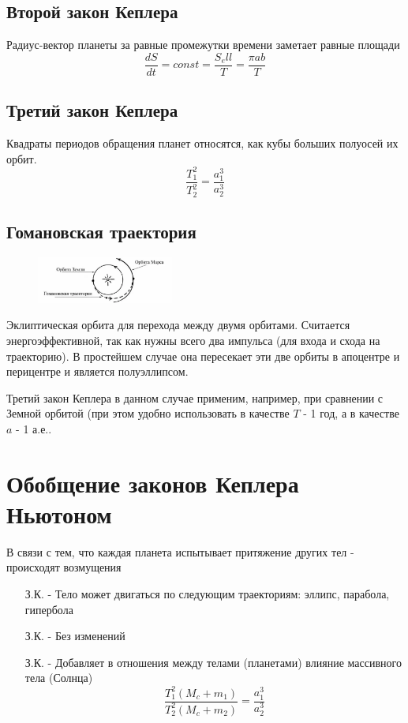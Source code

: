 \documentclass[16pt,a4paper]{report}
\begin{document}
\subsection{Второй закон Кеплера}
Радиус-вектор планеты за равные промежутки времени заметает равные площади
$$\frac{dS}{dt} = const = \frac{S_ell}{T} = \frac{\pi ab}{T}$$
\subsection{Третий закон Кеплера}
Квадраты периодов обращения планет относятся, как кубы больших полуосей их орбит.
$$\frac{T_1^2}{T_2^2} = \frac{a_1^3}{a_2^3}$$
\subsection{Гомановская траектория}
\begin{figure} %
    \centering
    \includegraphics[width=0.4\textwidth]{goman.png}
\end{figure}
Эклиптическая орбита для перехода между двумя орбитами. Считается энергоэффективной, так как нужны всего два импульса (для входа и схода на траекторию). В простейшем случае она пересекает эти две орбиты в апоцентре и перицентре и является полуэллипсом.

Третий закон Кеплера в данном случае применим, например, при сравнении с Земной орбитой (при этом удобно использовать в качестве $T$ - 1 год, а в качестве $a$ - 1 а.е..
\section{Обобщение законов Кеплера Ньютоном}
В связи с тем, что каждая планета испытывает притяжение других тел - происходят возмущения
\setcounter{foo}{1} 
\begin{enumerate}
    \item [\Roman{foo} З.К.] - Тело может двигаться по следующим траекториям: эллипс, парабола, гипербола \setcounter{foo}{2}
    \item [\Roman{foo} З.К.] - Без изменений \setcounter{foo}{3}
    \item [\Roman{foo} З.К.] - Добавляет в отношения между телами (планетами) влияние массивного тела (Солнца) $$\frac{T_1^2(M_c + m_1)}{T_2^2(M_c + m_2)}=\frac{a_1^3}{a_2^3}$$
\end{enumerate}
\end{document}
